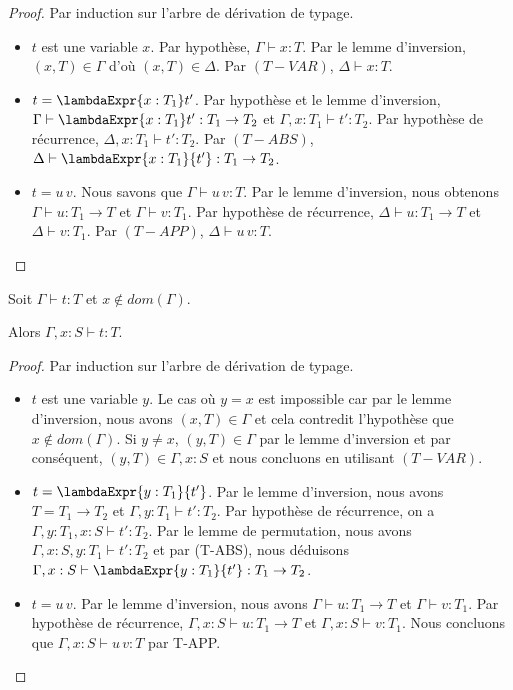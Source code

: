 \begin{proof}
  \label{proof:simply-typed-lambda-calculus-permutation}
  Par induction sur l'arbre de dérivation de typage.
  \begin{itemize}
  \item $t$ est une variable $x$. Par hypothèse, $\Gamma \vdash x : T$. Par le lemme
    d'inversion, $(x, T) \in \Gamma$ d'où $(x, T) \in \Delta$. Par $(T-VAR)$,
    $\Delta \vdash x : T$.
  \item $t = \lambdaExpr{x : T_{1}} t'$. Par hypothèse et le lemme d'inversion,
    $\Gamma \vdash \lambdaExpr{x : T_{1}} t' : T_{1} \rightarrow T_{2}$ et
    $\Gamma, x : T_{1} \vdash t' : T_{2}$. Par hypothèse de récurrence, $\Delta,
    x : T_{1} \vdash t' : T_{2}$. Par $(T-ABS)$, $\Delta \vdash \lambdaExpr{x :
      T_{1}}{t'} : T_{1} \rightarrow T_{2}$.
  \item $t = u \, v$. Nous savons que $\Gamma \vdash u \, v : T$. Par le lemme
    d'inversion, nous obtenons $\Gamma \vdash u : T_{1} \rightarrow T$ et
    $\Gamma \vdash v : T_{1}$. Par hypothèse de récurrence, $\Delta \vdash u :
    T_{1} \rightarrow T$ et $\Delta \vdash v : T_{1}$. Par $(T-APP)$, $\Delta
    \vdash u \, v : T$.
  \end{itemize}
\end{proof}

\begin{lemma} [d'affaiblissement]
  \label{thm:simply-typed-lambda-calculus-weakening}
  Soit $\Gamma \vdash t : T$ et $x \notin dom(\Gamma)$.

  Alors $\Gamma, x : S \vdash t : T$.
\end{lemma}

\begin{proof}
  \label{proof:simply-typed-lambda-calculus-weakening}
  Par induction sur l'arbre de dérivation de typage.
  \begin{itemize}
  \item $t$ est une variable $y$. Le cas où $y = x$ est impossible car par le
    lemme d'inversion, nous avons $(x, T) \in \Gamma$ et cela contredit
    l'hypothèse que $x \notin dom(\Gamma)$. Si $y \neq x$, $(y, T) \in \Gamma$ par le
    lemme d'inversion et par conséquent, $(y, T) \in \Gamma, x : S$ et nous
    concluons en utilisant $(T-VAR)$.
  \item $t = \lambdaExpr{y : T_{1}}{t'}$. Par le
    lemme d'inversion, nous avons $T = T_{1} \rightarrow T_{2}$ et $\Gamma, y :
    T_{1} \vdash t' : T_{2}$. Par hypothèse de récurrence, on a $\Gamma, y :
    T_{1}, x : S \vdash t' : T_{2}$. Par le lemme de permutation, nous avons
    $\Gamma, x : S, y : T_{1} \vdash t' : T_{2}$ et par (T-ABS), nous déduisons
    $\Gamma, x : S \vdash \lambdaExpr{y : T_{1}}{t'} : T_{1} \rightarrow T_{2}$.
    \item $t = u \, v$. Par le lemme
      d'inversion, nous avons $\Gamma \vdash u : T_{1} \rightarrow T$ et $\Gamma
      \vdash v : T_{1}$. Par hypothèse de récurrence, $\Gamma, x : S \vdash u :
      T_{1} \rightarrow T$ et $\Gamma, x : S \vdash v : T_{1}$. Nous concluons
      que $\Gamma, x : S \vdash u \, v : T$ par T-APP.
  \end{itemize}
\end{proof}

